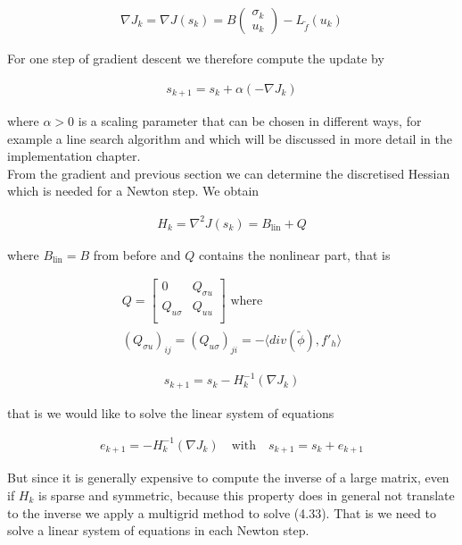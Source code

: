 \documentclass[../draft_1.tex]{subfiles}
\begin{document}
\begin{ceqn}
	\begin{align}
	\nabla J_k = \nabla J(s_k) = B \begin{pmatrix}
	\sigma_k \\
	u_k
	\end{pmatrix} - L_{\tilde{f}}(u_k)
	\end{align}
\end{ceqn}
For one step of gradient descent we therefore compute the update by 
\begin{ceqn}
	\begin{align}
s_{k+1} = s_k + \alpha (-\nabla J_k)
	\end{align}
\end{ceqn}
where $\alpha > 0$ is a scaling parameter that can be chosen in different ways, for example a line search algorithm and which will be discussed in more detail in the implementation chapter. 
\smallskip
\\
From the gradient and previous section we can determine the discretised Hessian which is needed for a Newton step. We obtain 
\begin{ceqn}
	\begin{align}
	H_k = \nabla^2 J(s_k) = B_{\text{lin}} + Q
	\end{align}
\end{ceqn}
where $B_{\text{lin}} = B$ from before and $Q$ contains the nonlinear part, that is
\begin{ceqn}
	\begin{align}
	Q = 
	\begin{bmatrix}
	0 &  Q_{\sigma u}  \\
	 Q_{u \sigma}  &    Q_{uu} \\
	\end{bmatrix}  \text{ where } \\
		 (Q_{\sigma u})_{ij}  = (Q_{u\sigma})_{ji} = - \langle div(\tilde{\phi}), f'_h \rangle
	\end{align}
\end{ceqn}



\begin{ceqn}
	\begin{align}	
	s_{k+1} = s_k - H_k^{-1}(\nabla J_k)
	\end{align}
\end{ceqn}
that is we would like to solve the linear system of equations 
\begin{ceqn}
	\begin{align}	
	e_{k+1} = - H_k^{-1}(\nabla J_k) \quad \text{with} \quad
	s_{k+1} =  s_k + e_{k+1}
	\end{align}
\end{ceqn}
But since it is generally expensive to compute the inverse of a large matrix, even if $H_k$ is sparse and symmetric, because this property does in general not translate to the inverse we apply a multigrid method to solve (4.33). That is we need to solve a linear system of equations in each Newton step. 
\end{document}
